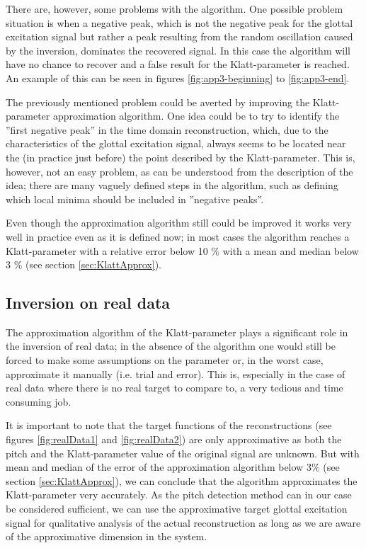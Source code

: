 \documentclass[12pt,a4]{article}
\begin{document}
There are, however, some problems with the algorithm. One possible problem situation is when a negative peak, which is not the negative peak for the glottal excitation signal but rather a peak resulting from the random oscillation caused by the inversion, dominates the recovered signal. In this case the algorithm will have no chance to recover and a false result for the Klatt-parameter is reached. An example of this can be seen in figures \ref{fig:app3-beginning} to \ref{fig:app3-end}.

The previously mentioned problem could be averted by improving the Klatt-parameter approximation algorithm. One idea could be to try to identify the ''first negative peak'' in the time domain reconstruction, which, due to the characteristics of the glottal excitation signal, always seems to be located near the (in practice just before) the point described by the Klatt-parameter. This is, however, not an easy problem, as can be understood from the description of the idea; there are many vaguely defined steps in the algorithm, such as defining which local minima should be included in ''negative peaks''.

Even though the approximation algorithm still could be improved it works very well in practice even as it is defined now; in most cases the algorithm reaches a Klatt-parameter with a relative error below 10 \% with a mean and median below 3 \% (see section \ref{sec:KlattApprox}).


\subsection{Inversion on real data}

The approximation algorithm of the Klatt-parameter plays a significant role in the inversion of real data; in the absence of the algorithm one would still be forced to make some assumptions on the parameter or, in the worst case, approximate it manually (i.e. trial and error). This is, especially in the case of real data where there is no real target to compare to, a very tedious and time consuming job. 

It is important to note that the target functions of the reconstructions (see figures \ref{fig:realData1} and \ref{fig:realData2}) are only approximative as both the pitch and the Klatt-parameter value of the original signal are unknown. But with mean and median of the error of the approximation algorithm below 3\% (see section \ref{sec:KlattApprox}), we can conclude that the algorithm approximates the Klatt-parameter very accurately. As the pitch detection method can in our case be considered sufficient, we can use the approximative target glottal excitation signal for qualitative analysis of the actual reconstruction as long as we are aware of the approximative dimension in the system.
\end{document}
